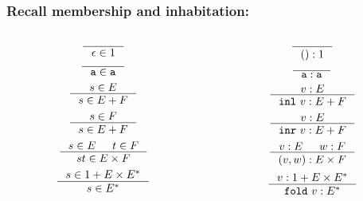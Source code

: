 \documentclass[slidestop,compress,mathserif, xcolor=table]{beamer}
\begin{document}
\begin{frame}
  \frametitle{Recall membership and inhabitation:}

  \begin{columns}[totalwidth=0.8\textwidth]
    \begin{column}{.5\textwidth}
      \[
      \inference{}{\epsilon \in 1}
      \]
      \[
      \inference{}{\texttt{a} \in \texttt{a}}
      \]
      \[
      \inference{s \in E}{s \in E + F}
      \]
      \[
      \inference{s \in F}{s \in E + F}
      \]
      \[
      \inference{s \in E & t \in F}{st \in E \times F}
      \]
      \[
      \inference{s \in 1 + E \times E^{\ast}}{s \in E^{\ast}}
      \]
    \end{column}
    \begin{column}{.5\textwidth}
      \[
      \inference{}{() : 1}
      \]
      \[
      \inference{}{\texttt{a} : \texttt{a}}
      \]
      \[
      \inference{v : E}{\mathtt{inl}\ v : E + F}
      \]
      \[
      \inference{v : E}{\mathtt{inr}\ v : E + F}
      \]
      \[
      \inference{v : E & w : F}{(v, w) : E \times F}
      \]
      \[
      \inference{v : 1 + E \times E^{\ast}}{\mathtt{fold}\ v : E^{\ast}}
      \]
    \end{column}
  \end{columns}
\end{frame}
\end{document}
